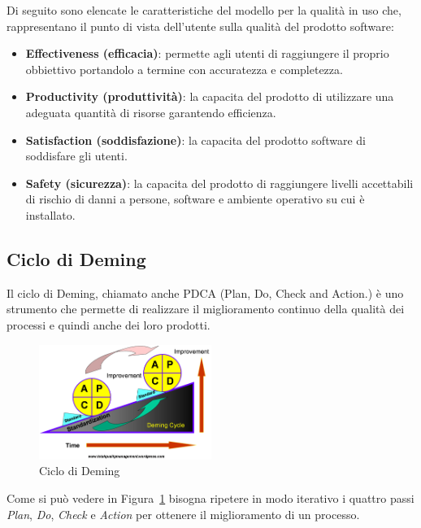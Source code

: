 Di seguito sono elencate le caratteristiche del modello per la qualità in uso che, rappresentano il punto di vista dell'utente sulla qualità del prodotto software:

\begin{itemize}
	\item \textbf{Effectiveness (efficacia)}:  permette agli utenti di raggiungere il proprio obbiettivo portandolo a termine con accuratezza e completezza.

	\item \textbf{Productivity (produttività)}: la capacita del prodotto di utilizzare una adeguata quantità di risorse garantendo efficienza.

	\item \textbf{Satisfaction (soddisfazione)}: la capacita del prodotto software di soddisfare gli utenti.

	\item \textbf{Safety (sicurezza)}: la capacita del prodotto di raggiungere livelli accettabili di rischio di danni a persone, software e ambiente operativo su cui è installato.
\end{itemize}

\subsection{Ciclo di Deming}
Il ciclo di Deming, chiamato anche PDCA (Plan, Do, Check and Action.) è uno strumento che permette di realizzare il miglioramento continuo della qualità dei processi e quindi anche dei loro prodotti.

\begin{figure}[h!]
	\centering
	\includegraphics[width=0.50\textwidth]{img/deming.png}
	\caption{Ciclo di Deming}
	\label{fig:PDCA}
\end{figure}

Come si può vedere in Figura~\ref{fig:PDCA} bisogna ripetere in modo iterativo i quattro passi \emph{Plan}, \emph{Do}, \emph{Check} e \emph{Action} per ottenere il miglioramento di un processo.

